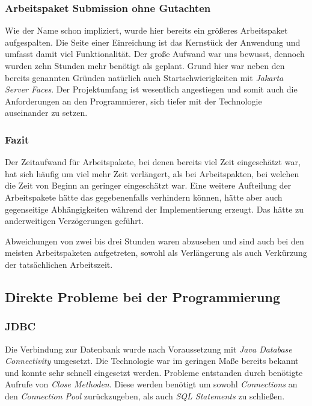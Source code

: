 \subsubsection{Arbeitspaket Submission ohne Gutachten}

Wie der Name schon impliziert, wurde hier bereits ein größeres Arbeitspaket aufgespalten. Die Seite einer Einreichung ist das Kernstück der Anwendung und umfasst damit viel Funktionalität. Der große Aufwand war uns bewusst, dennoch wurden zehn Stunden mehr benötigt als geplant. Grund hier war neben den bereits genannten Gründen natürlich auch Startschwierigkeiten mit  \emph{Jakarta Server Faces}. Der Projektumfang ist wesentlich angestiegen und somit auch die Anforderungen an den Programmierer, sich tiefer mit der Technologie auseinander zu setzen.

\subsubsection{Fazit}

Der Zeitaufwand für Arbeitspakete, bei denen bereits viel Zeit eingeschätzt war, hat sich häufig um viel mehr Zeit verlängert, als bei Arbeitspakten, bei welchen die Zeit von Beginn an geringer eingeschätzt war. Eine weitere Aufteilung der Arbeitspakete hätte das gegebenenfalls verhindern können, hätte aber auch gegenseitige Abhängigkeiten während der Implementierung erzeugt. Das hätte zu anderweitigen Verzögerungen geführt.


Abweichungen von zwei bis drei Stunden waren abzusehen und sind auch bei den meisten Arbeitspaketen aufgetreten, sowohl als Verlängerung als auch Verkürzung der tatsächlichen Arbeitszeit.

\subsection{Direkte Probleme bei der Programmierung}

\subsubsection{JDBC}

Die Verbindung zur Datenbank wurde nach Voraussetzung mit \emph{Java Database Connectivity} umgesetzt. Die Technologie war im geringen Maße bereits bekannt und konnte sehr schnell eingesetzt werden. Probleme entstanden durch benötigte Aufrufe von \emph{Close Methoden}. Diese werden benötigt um sowohl \emph{Connections} an den \emph{Connection Pool} zurückzugeben, als auch \emph{SQL Statements} zu schließen.

